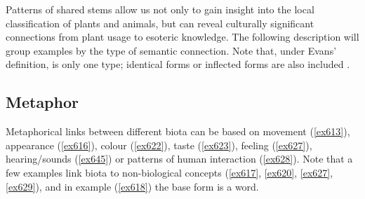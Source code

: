 Patterns of shared stems allow us not only to gain insight into the local classification of plants and animals, but can reveal culturally significant connections from plant usage to esoteric knowledge. The following description will group examples by the type of semantic connection. Note that, under Evans' definition,  is only one type; identical forms or inflected forms are also included \citep[136]{Evans:1997vj}.

\subsection{Metaphor}\label{redupmetaphor}

Metaphorical links between different biota can be based on movement (\ref{ex613}), appearance (\ref{ex616}), colour (\ref{ex622}), taste (\ref{ex623}), feeling (\ref{ex627}), hearing/sounds (\ref{ex645}) or patterns of human interaction (\ref{ex628}). Note that a few examples link biota to non-biological concepts (\ref{ex617}, \ref{ex620}, \ref{ex627}, \ref{ex629}), and in example (\ref{ex618}) the base form is a  word.

